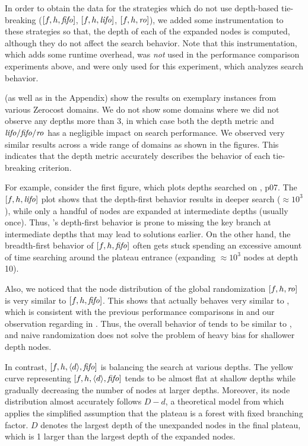 In order to obtain the data for the strategies which do not use depth-based tie-breaking ($[f,h,{\text{\textit{fifo}}}]$, $[f,h,{\text{\textit{lifo}}}]$, $[f,h,{\text{\textit{ro}}}]$), we added some instrumentation to these strategies so that, the depth of each of the expanded nodes is computed, although they do not affect the search behavior.
Note that this instrumentation, which adds some runtime overhead, was \emph{not}
used in the performance comparison experiments above, and were only used for this experiment, which analyzes search behavior.


 (as well as  in the Appendix) show the results on exemplary instances from 
various Zerocost domains.  We do not show some domains where we did not observe any depths more than 3, in which case both
the depth metric and  ${\text{\textit{lifo}}}/{\text{\textit{fifo}}}/{\text{\textit{ro}}}$ has a negligible impact on search performance.
We observed very similar results across a wide range of domains as shown in the figures.
This indicates that the depth metric accurately describes the behavior of each tie-breaking criterion.

For example, consider the first figure, which plots depths searched on , p07.
% 
The  $[f,h,{\text{\textit{lifo}}}]$ plot shows that the depth-first behavior results in deeper search ($\approx 10^3$), while
only a handful of nodes are expanded at intermediate depths (usually once). Thus,  \lifo's depth-first
behavior is prone to  missing the key branch at intermediate depths that may lead to solutions earlier.
On the other hand, the breadth-first behavior of $[f,h,{\text{\textit{fifo}}}]$ often gets stuck spending an excessive amount of
time searching around the plateau entrance (expanding $\approx 10^3$ nodes at depth 10).

Also, we noticed that the node distribution of the global randomization $[f,h,{\text{\textit{ro}}}]$ is very similar to $[f,h,{\text{\textit{fifo}}}]$.
This shows that \ro actually behaves very similar to \fifo, which is consistent with the previous performance comparisons in  and our observation regarding \ro in .
Thus, the overall behavior of \ro tends to be similar to \fifo, and naive randomization does not solve the problem of heavy bias for shallower depth nodes.

In contrast, $[f,h,{\left<d\right>},{\text{\textit{fifo}}}]$ is balancing the search at various depths.
The yellow curve representing $[f,h,{\left<d\right>},{\text{\textit{fifo}}}]$ tends to be almost flat at shallow depths while gradually decreasing the number of nodes at larger depths.
Moreover, its node distribution almost accurately follows $D-d$, a theoretical model from  which applies the simplified
assumption that the plateau is a forest with fixed branching factor.
$D$ denotes the largest depth of the unexpanded nodes in the final plateau, which is
1 larger than the largest depth of the expanded nodes.

